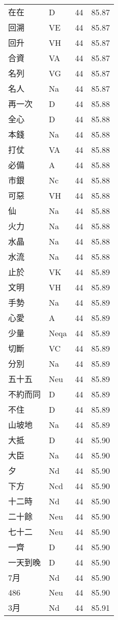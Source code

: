 \documentclass[twocolumn]{book}
\begin{document}
\begin{supertabular}{llrr}
在在 & D & 44 &  85.87\\
回溯 & VE & 44 &  85.87\\
回升 & VH & 44 &  85.87\\
合資 & VA & 44 &  85.87\\
名列 & VG & 44 &  85.87\\
名人 & Na & 44 &  85.87\\
再一次 & D & 44 &  85.88\\
全心 & D & 44 &  85.88\\
本錢 & Na & 44 &  85.88\\
打仗 & VA & 44 &  85.88\\
必備 & A & 44 &  85.88\\
市銀 & Nc & 44 &  85.88\\
可惡 & VH & 44 &  85.88\\
仙 & Na & 44 &  85.88\\
火力 & Na & 44 &  85.88\\
水晶 & Na & 44 &  85.88\\
水流 & Na & 44 &  85.88\\
止於 & VK & 44 &  85.89\\
文明 & VH & 44 &  85.89\\
手勢 & Na & 44 &  85.89\\
心愛 & A & 44 &  85.89\\
少量 & Neqa & 44 &  85.89\\
切斷 & VC & 44 &  85.89\\
分別 & Na & 44 &  85.89\\
五十五 & Neu & 44 &  85.89\\
不約而同 & D & 44 &  85.89\\
不住 & D & 44 &  85.89\\
山坡地 & Na & 44 &  85.89\\
大抵 & D & 44 &  85.90\\
大臣 & Na & 44 &  85.90\\
夕 & Nd & 44 &  85.90\\
下方 & Ncd & 44 &  85.90\\
十二時 & Nd & 44 &  85.90\\
二十餘 & Neu & 44 &  85.90\\
七十二 & Neu & 44 &  85.90\\
一齊 & D & 44 &  85.90\\
一天到晚 & D & 44 &  85.90\\
7月 & Nd & 44 &  85.90\\
486 & Neu & 44 &  85.90\\
3月 & Nd & 44 &  85.91\\

\end{supertabular}
\end{document}
